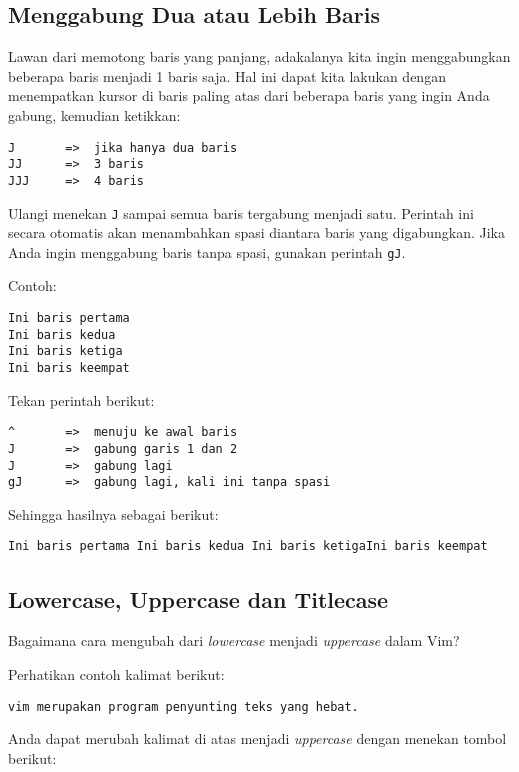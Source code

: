 \documentclass{article}
\begin{document}
\subsection{Menggabung Dua atau Lebih Baris}
Lawan dari memotong baris yang panjang, adakalanya kita
ingin menggabungkan beberapa baris menjadi 1 baris saja.
Hal ini dapat kita lakukan dengan menempatkan kursor di
baris paling atas dari beberapa baris yang ingin Anda
gabung, kemudian ketikkan:

\begin{verbatim}
J       =>  jika hanya dua baris
JJ      =>  3 baris
JJJ     =>  4 baris
\end{verbatim}

Ulangi menekan \verb=J= sampai semua baris tergabung menjadi
satu. Perintah ini secara otomatis akan menambahkan spasi
diantara baris yang digabungkan. Jika Anda ingin menggabung
baris tanpa spasi, gunakan perintah \verb=gJ=.

Contoh:

\begin{verbatim}
Ini baris pertama
Ini baris kedua
Ini baris ketiga
Ini baris keempat
\end{verbatim}

Tekan perintah berikut:

\begin{verbatim}
^       =>  menuju ke awal baris
J       =>  gabung garis 1 dan 2
J       =>  gabung lagi
gJ      =>  gabung lagi, kali ini tanpa spasi
\end{verbatim}

Sehingga hasilnya sebagai berikut:

\begin{verbatim}
Ini baris pertama Ini baris kedua Ini baris ketigaIni baris keempat
\end{verbatim}

\subsection{Lowercase, Uppercase dan Titlecase}
Bagaimana cara mengubah dari \emph{lowercase} menjadi
\emph{uppercase} dalam Vim?

Perhatikan contoh kalimat berikut:

\begin{verbatim}
vim merupakan program penyunting teks yang hebat.
\end{verbatim}

Anda dapat merubah kalimat di atas menjadi \emph{uppercase}
dengan menekan tombol berikut:
\end{document}
